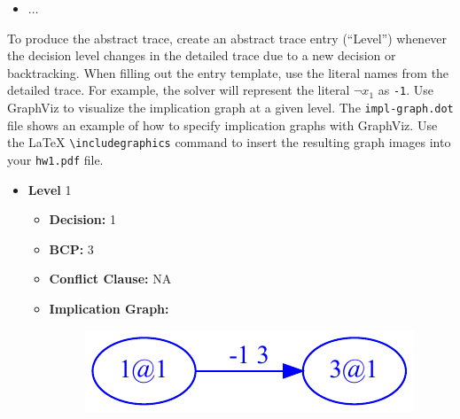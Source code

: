 \documentclass{article}
\newenvironment{solution}{\color{blue} \em }{}
\begin{document}
\begin{enumerate}
\begin{itemize}
\begin{itemize}
		\end{itemize}
		\item $\ldots$
	\end{itemize}

	To produce the abstract trace, create an abstract trace  entry (``Level'') whenever the decision level changes in the detailed trace due to a new decision or backtracking. When filling out the entry template, use the literal names from the detailed trace. For example, the solver will represent the literal $\neg x_1$ as \texttt{-1}. Use GraphViz to visualize the implication graph at a given level. The \texttt{impl-graph.dot} file shows an example of how to specify implication graphs with GraphViz. Use the LaTeX \texttt{\textbackslash includegraphics} command to insert the resulting graph images into your \texttt{hw1.pdf} file.


\begin{solution}
	\begin{itemize}
\item \textbf{Level} 1
\begin{itemize}
	\item \textbf{Decision:} 1
	\item \textbf{BCP:} 3
	\item \textbf{Conflict Clause:} NA
	\item \textbf{Implication Graph:} 
	\begin{figure}[h!]
		\begin{center}
			\includegraphics[scale=0.75]{sat-images/graph1}
		\end{center}
	\end{figure}
\end{itemize}

\pagebreak


\end{itemize}
\end{solution}
\end{enumerate}
\end{document}
